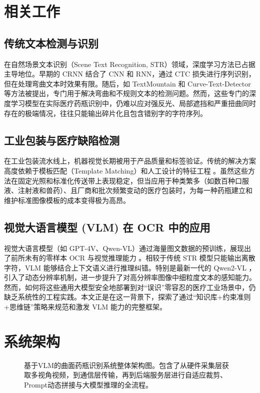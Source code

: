 \documentclass[11pt,a4paper]{ctexart}
\begin{document}
\section{相关工作}
\subsection{传统文本检测与识别}
在自然场景文本识别（Scene Text Recognition, STR）领域，深度学习方法已占据主导地位。早期的 CRNN 结合了 CNN 和 RNN，通过 CTC 损失进行序列识别，但在处理弯曲文本时效果有限。随后，如 TextMountain 和 Curve-Text-Detector \cite{liu2019curved} 等方法被提出，专门用于解决弯曲和不规则文本的检测问题。然而，这些专门的深度学习模型在实际医疗药瓶识别中，仍难以应对强反光、局部遮挡和严重扭曲同时存在的极端情况，往往只能输出碎片化且包含错别字的字符序列。

\subsection{工业包装与医疗缺陷检测}
在工业包装流水线上，机器视觉长期被用于产品质量和标签验证。传统的解决方案高度依赖于模板匹配（Template Matching）和人工设计的特征工程 \cite{zhang2023printing}。虽然这些方法在固定光照和标准化传送带上表现稳定，但当应用于种类繁多（如数百种口服液、注射液和兽药）、且厂商和批次频繁变动的医疗包装时，为每一种药瓶建立和维护标准图像模板的成本变得极为高昂。

\subsection{视觉大语言模型 (VLM) 在 OCR 中的应用}
视觉大语言模型（如 GPT-4V、Qwen-VL）通过海量图文数据的预训练，展现出了前所未有的零样本 OCR 与视觉推理能力 \cite{shi2023exploring, qwen_vl}。相较于传统 STR 模型只能输出离散字符，VLM 能够结合上下文语义进行推理纠错。特别是最新一代的 Qwen2-VL \cite{wang2024qwen2}，引入了动态分辨率机制，进一步提升了对高分辨率图像中细粒度文本的感知能力。然而，如何将这些通用大模型安全地部署到对“误识”零容忍的医疗工业场景中，仍缺乏系统性的工程实践。本文正是在这一背景下，探索了通过“知识库+约束准则+思维链”策略来规范和激发 VLM 能力的完整框架。

\section{系统架构}
\begin{figure}[h]
\centering
\vspace{4cm} %
\caption{基于VLM的曲面药瓶识别系统整体架构图。包含了从硬件采集层获取多视角视频，到通信层传输，再到后端服务层进行自适应裁剪、Prompt动态拼接与大模型推理的全流程。}
\label{fig:architecture}
\end{figure}
\end{document}
